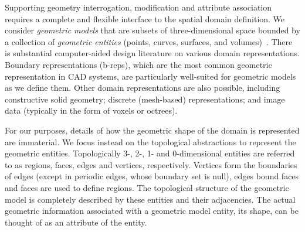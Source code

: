 


Supporting geometry interrogation, modification and attribute
association requires a complete and flexible interface to the spatial
domain definition.  We consider {\it geometric models} that are subsets
of three-dimensional space bounded by a collection of {\it geometric
entities} (points, curves, surfaces, and volumes)~\cite{mort97}.  There
is substantial computer-aided design literature on various domain
representations.  Boundary representations (b-reps), which are the
most common geometric representation in CAD systems, are particularly
well-suited for geometric models as we define them.  Other domain
representations are also possible, including constructive solid
geometry; discrete (mesh-based) representations; and image data
(typically in the form of voxels or octrees).

For our purposes, details of how the geometric shape of the domain is
represented are immaterial.  We focus instead on the topological
abstractions to represent the geometric entities.  Topologically 3-, 2-,
1- and 0-dimensional entities are referred to as regions, faces, edges
and vertices, respectively.  Vertices form the boundaries of edges
(except in periodic edges, whose boundary set is null), edges bound
faces and faces are used to define regions.  The topological structure
of the geometric model is completely described by these entities and
their adjacencies.  The actual geometric information associated with a
geometric model entity, its shape, can be thought of as an attribute of
the entity.

